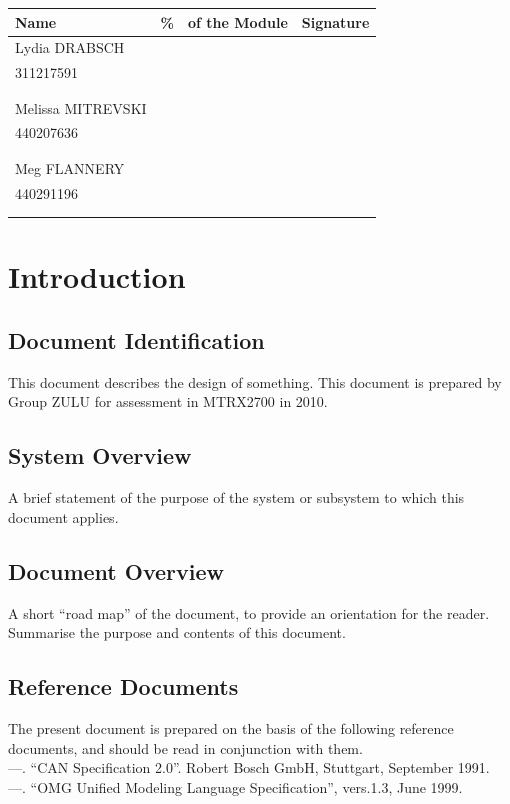 \documentclass[11pt,a4paper]{article}
\renewcommand{\thepage}{\roman{page}}
\renewcommand{\thepage}{\roman{page}}
\begin{document}
\begin{table}[h]
\centering
\begin{tabular}{|p{4cm}|p{0.75cm}|p{5cm}|p{4cm}|}
\hline Name & \% & of the Module & Signature\\
\hline Lydia DRABSCH & & &  \\
\cline{2-3} 311217591 & & & \\
\cline{2-3} & & & \\
\cline{2-3} & & & \\
\hline Melissa MITREVSKI& & & \\
\cline{2-3} 440207636 & & & \\
\cline{2-3} & & & \\
\cline{2-3} & & & \\
\hline Meg FLANNERY & & & \\
\cline{2-3} 440291196 & & & \\
\cline{2-3} & & & \\
\cline{2-3} & & & \\
\hline
\end{tabular}
\end{table}
\newpage

\tableofcontents
\listoffigures
\listoftables
\newpage
{}


\section{Introduction}
\subsection{Document Identification}
This document describes the design of something. This document is prepared by Group ZULU for assessment in MTRX2700 in 2010.
\subsection{System Overview}
A brief statement of the purpose of the system or subsystem to which this document applies.
\subsection{Document Overview}
A short “road map” of the document, to provide an orientation for the reader. Summarise the purpose and contents of this document.
\subsection{Reference Documents}
The present document is prepared on the basis of the following reference documents, and should be read in conjunction with them.\\
—.  “CAN Specification 2.0”.  Robert Bosch GmbH, Stuttgart, September 1991.\\
—.  “OMG Unified Modeling Language Specification”, vers.1.3, June 1999.
\end{document}
